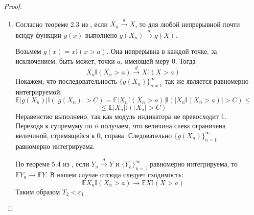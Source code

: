 \documentclass[12pt]{article}
\theoremstyle{plain}
\theoremstyle{definition}
\theoremstyle{remark}
\begin{document}
\begin{proof}
\begin{enumerate}
\begin{enumerate}[label=(\roman*):, font=\textit]
        Оценим вероятность этого события:
        \[
            \mathbb{P}(\min{(a_n, a)} < X_n < \max{(a_n, a)}) = F_{X_n}(\max{(a_n, a)}) - F_{X_n}(\min{(a_n, a)})
        \]

        Поскольку $a_n \to a$, то $\forall\;\delta_1 > 0 \;\exists\; N_1 \in \mathbb{N}$, что для всех $n > N_1\; |a_n-a|<\delta_1 \implies a_n< a + \delta_1$ и $a_n> a - \delta_1$. Отсюда следует, что $\min{(a_n, a)} > a - \delta_1$ и $\max{(a_n, a)} < a + \delta_1$.

        Воспользуемся монотонностью $F_{X_n}(x)$:
        \[ 
            F_{X_n}(\max{(a_n, a)}) - F_{X_n}(\min{(a_n, a)}) \leq F_{X_n}(a+\delta_1) - F_{X_n}(a-\delta_1) \to 
        \]
        \[
            \to F_{X}(a+\delta_1) - F_{X}(a-\delta_1) \text{ при } n\to\infty
        \]
        В силу непрерывности $F_X(x)$ можно выбрать $\delta_1$ таким, что разность будет меньше $\delta$. 

        Таким образом, $T_1 < \varepsilon_1$ в силу приведенного в начале факта.

        \item 

        Согласно теореме 2.3 из \cite{метка6}, если $X_n\overset{d}{\to}X$, то для любой непрерывной почти всюду функции $g(x)$ выполнено $g(X_n)\overset{d}{\to}g(X)$.
        
        Возьмем $g(x) = x\mathbb{I}(x>a)$. Она непрерывна в каждой точке, за исключением, быть может, точки $a$, имеющей меру 0. Тогда 
        \[
            X_n\mathbb{I}(X_n>a) \overset{d}{\to}X\mathbb{I}(X>a)
        \]
        Покажем, что последовательность $\{g(X_n)\}_{n=1}^\infty$ так же является равномерно интегрируемой:
        \[
            \mathbb{E}|g(X_n)|\mathbb{I}(|g(X_n)|>C) = \mathbb{E}|X_n\mathbb{I}(X_n>a)|\mathbb{I}(|X_n\mathbb{I}(X_n>a)|>C) \leq
        \]
        \[
            \leq \mathbb{E}|X_n|\mathbb{I}(|X_n|>C)
        \]
        Неравенство выполнено, так как модуль индикатора не превосходит 1. Переходя к супремуму по $n$ получаем, что величина слева ограничена величиной, стремящейся к 0, справа. Следовательно $\{g(X_n)\}_{n=1}^\infty$ равномерно интегрируема.

        По теореме 5.4 из \cite{метка7}, если $Y_n\overset{d}{\to}Y$ и $\{Y_n\}_{n=1}^\infty$ равномерно интегрируема, то $\mathbb{E}Y_n\to \mathbb{E}Y$. В нашем случае отсюда следует сходимость:
        \[
            \mathbb{E}X_n\mathbb{I}(X_n>a) \to \mathbb{E}X\mathbb{I}(X>a)
        \]
        Таким образом $T_2 < \varepsilon_1$
        

\end{enumerate}
\end{enumerate}
\end{proof}
\end{document}
